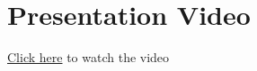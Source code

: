 \section{Presentation Video}
\href{https://drive.google.com/file/d/1YZvHunws_VdB13_Il37dTGiP3yG2GYvu/view?usp=sharing}{Click here} to watch the video